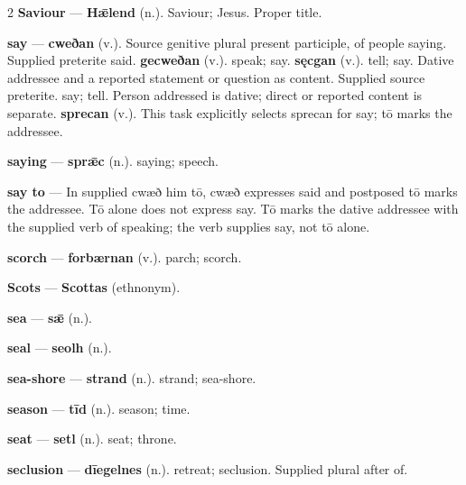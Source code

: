 \begin{multicols}{2}
\textbf{Saviour} — \textbf{Hǣlend} (n.). Saviour; Jesus. Proper title.\par
\textbf{say} — \textbf{cweðan} (v.). Source genitive plural present participle, of people saying. Supplied preterite said. \textbf{gecweðan} (v.). speak; say. \textbf{sęcgan} (v.). tell; say. Dative addressee and a reported statement or question as content. Supplied source preterite. say; tell. Person addressed is dative; direct or reported content is separate. \textbf{sprecan} (v.). This task explicitly selects sprecan for say; tō marks the addressee.\par
\textbf{saying} — \textbf{sprǣc} (n.). saying; speech.\par
\textbf{say to} — In supplied cwæð him tō, cwæð expresses said and postposed tō marks the addressee. Tō alone does not express say. Tō marks the dative addressee with the supplied verb of speaking; the verb supplies say, not tō alone.\par
\textbf{scorch} — \textbf{forbærnan} (v.). parch; scorch.\par
\textbf{Scots} — \textbf{Scottas} (ethnonym).\par
\textbf{sea} — \textbf{sǣ} (n.).\par
\textbf{seal} — \textbf{seolh} (n.).\par
\textbf{sea-shore} — \textbf{strand} (n.). strand; sea-shore.\par
\textbf{season} — \textbf{tīd} (n.). season; time.\par
\textbf{seat} — \textbf{setl} (n.). seat; throne.\par
\textbf{seclusion} — \textbf{dīegelnes} (n.). retreat; seclusion. Supplied plural after of.\par

\end{multicols}
